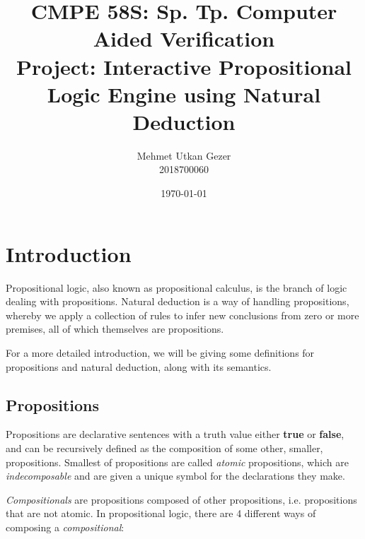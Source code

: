 \documentclass{article}
\title{CMPE 58S: Sp. Tp. Computer Aided Verification \\ Project: Interactive Propositional Logic Engine using Natural Deduction}
\date{\today{}}
\author{Mehmet Utkan Gezer \\ 2018700060}
\newcommand{\true}{\textbf{true}}
\newcommand{\false}{\textbf{false}}
\begin{document}
\maketitle

\section{Introduction}

Propositional logic, also known as propositional calculus, is the branch
of logic dealing with propositions. Natural deduction is a way of handling
propositions, whereby we apply a collection of rules to infer new
conclusions from zero or more premises, all of which themselves are
propositions.

For a more detailed introduction, we will be giving some definitions for
propositions and natural deduction, along with its semantics.

\subsection{Propositions}\label{sec:intr_prop}

Propositions are declarative
sentences with a truth value either \true{} or \false{},
and can be recursively defined as the composition of
some other, smaller, propositions. Smallest of propositions are
called \textit{atomic} propositions, which are \textit{indecomposable}
and are given a unique symbol for the declarations they make.

\textit{Compositionals} are propositions composed of other propositions,
i.e. propositions that are not atomic. In propositional logic, there
are 4 different ways of composing a \textit{compositional}:
\end{document}
